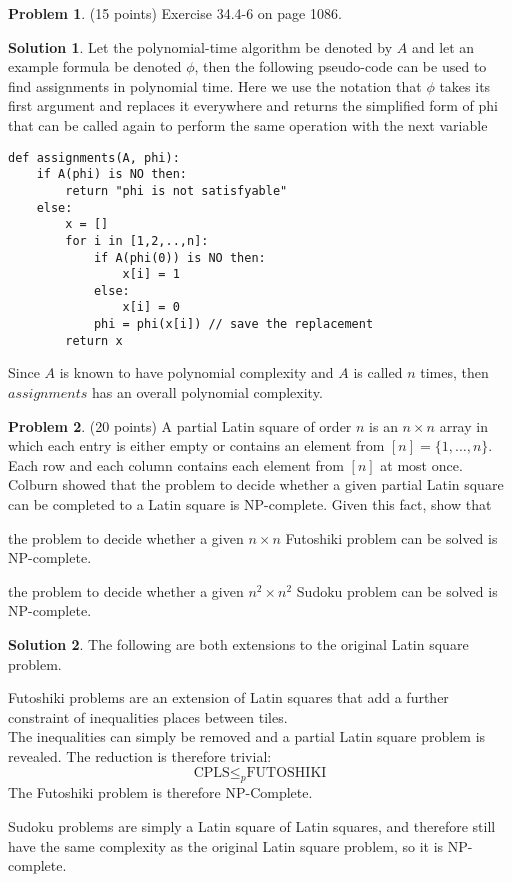 \documentclass{article}
\theoremstyle{definition}
\newtheorem{problem}{Problem}
\newtheorem*{solution}{Solution}
\begin{document}
\begin{problem} (15 points) %
Exercise 34.4-6 on page 1086. 
\end{problem}
\begin{solution}
Let the polynomial-time algorithm be denoted by $A$ and let an example formula be denoted $\phi$, then the following pseudo-code can be used to find assignments in polynomial time. Here we use the notation that $\phi$ takes its first argument and replaces it everywhere and returns the simplified form of phi that can be called again to perform the same operation with the next variable\\
\begin{verbatim}
def assignments(A, phi):
    if A(phi) is NO then:
        return "phi is not satisfyable"
    else:
        x = []
        for i in [1,2,..,n]:
            if A(phi(0)) is NO then:
                x[i] = 1
            else:
                x[i] = 0
            phi = phi(x[i]) // save the replacement
        return x
\end{verbatim}
Since $A$ is known to have polynomial complexity and $A$ is called $n$ times, then $assignments$ has an overall polynomial complexity.
\end{solution}

\begin{problem} (20 points)
A partial Latin square of order $n$ is an $n\times n$ array in which
each entry is either empty or contains an element from $[n] = \{1,\ldots,
n\}$. Each row and each column contains each element from $[n]$ at
most once. Colburn showed that the problem to decide whether a given
partial Latin square can be completed to a Latin square is
NP-complete. Given this fact, show that 
\begin{compactenum}[(a)]
\item the problem to decide whether a given $n\times n$ Futoshiki
  problem can be solved is NP-complete. 
\item the problem to decide whether a given $n^2\times n^2$ Sudoku 
  problem can be solved is NP-complete. 
\end{compactenum}
\end{problem}
\begin{solution} The following are both extensions to the original Latin square problem.
\begin{compactenum}[(a)]
\item Futoshiki problems are an extension of Latin squares that add a further constraint of inequalities places between tiles.\\
    The inequalities can simply be removed and a partial Latin square problem is revealed. The reduction is therefore trivial: \\
    $$ \text{CPLS} \leq_p \text{FUTOSHIKI} $$
    The Futoshiki problem is therefore NP-Complete.
\item Sudoku problems are simply a Latin square of Latin squares, and therefore still have the same complexity as the original Latin square problem, so it is NP-complete.
\end{compactenum}
\end{solution}
\end{document}
